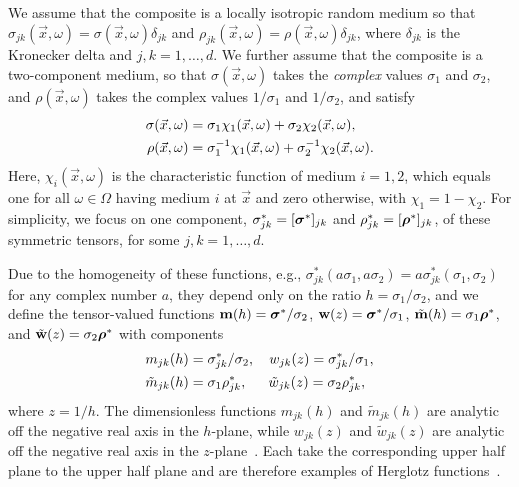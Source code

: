 \documentclass{cmslatex}
\newcommand\bsig{\mbox{\boldmath${\sigma}$}}
\newcommand\brho{\mbox{\boldmath${\rho}$}}
\begin{document}
We assume that the composite is a locally isotropic random medium so
that $\sigma_{jk}(\vec{x},\omega)=\sigma(\vec{x},\omega)\delta_{jk}$ and
$\rho_{jk}(\vec{x},\omega)=\rho(\vec{x},\omega)\delta_{jk}$, where $\delta_{jk}$ is the
Kronecker delta and $j,k=1,\ldots,d$. We further assume that the composite
is a two-component medium, so that $\sigma(\vec{x},\omega)$ takes the
\emph{complex} values $\sigma_1$ and $\sigma_2$, and $\rho(\vec{x},\omega)$ takes the
complex values $1/\sigma_1$ and $1/\sigma_2$, and satisfy~\cite{Golden:CMP-473}
% 
\begin{align}\label{eq:two-phase_eps}
  \sigma(\vec{x},\omega)&=\sigma_1\chi_1(\vec{x},\omega)+\sigma_2\chi_2(\vec{x},\omega),
  \\
  \rho(\vec{x},\omega)&=\sigma_1^{-1}\chi_1(\vec{x},\omega)+\sigma_2^{-1}\chi_2(\vec{x},\omega).
  \notag
\end{align}
%
Here, $\chi_i(\vec{x},\omega)$ is the characteristic function of medium
$i=1,2$, which equals one for all $\omega\in\Omega$ having medium $i$ at $\vec{x}$
and zero otherwise, with $\chi_1=1-\chi_2$. For simplicity, we focus on one
component, $\sigma^*_{jk}=[\bsig^*]_{jk}$ and $\rho^*_{jk}=[\brho^*]_{jk}$, of
these symmetric tensors, for some $j,k=1,\ldots,d$.  



Due to the homogeneity of these functions,
e.g., $\sigma_{jk}^*(a\sigma_1,a\sigma_2)=a\sigma_{jk}^*(\sigma_1,\sigma_2)$ for any complex number
$a$, they depend only on the ratio $h=\sigma_1/\sigma_2$, and we define the
tensor-valued functions $\mathbf{m}(h)=\bsig^*/\sigma_2$,
$\mathbf{w}(z)=\bsig^*/\sigma_1$, $\tilde{\mathbf{m}}(h)=\sigma_1\brho^*$, and
$\tilde{\mathbf{w}}(z)=\sigma_2\brho^*$ with components  
%
\begin{align}\label{eq:m_h}
  &m_{jk}(h)=\sigma_{jk}^*/\sigma_2, \quad
  w_{jk}(z)=\sigma_{jk}^*/\sigma_1, \\
   &\tilde{m}_{jk}(h)=\sigma_1\rho_{jk}^*, \quad
   \hspace{0.5em}\tilde{w}_{jk}(z)=\sigma_2\rho_{jk}^*,
   \notag
\end{align}
%
where $z=1/h$. The dimensionless functions $m_{jk}(h)$ and
$\tilde{m}_{jk}(h)$ are analytic off the negative real axis in the
$h$-plane, while $w_{jk}(z)$ and $\tilde{w}_{jk}(z)$ are analytic off
the negative real axis in the $z$-plane~\cite{Golden:CMP-473}. Each
take the corresponding upper half plane to the upper half plane and
are therefore examples of Herglotz
functions~\cite{Deift:2000:RMT,Golden:CMP-473}. 
\end{document}
